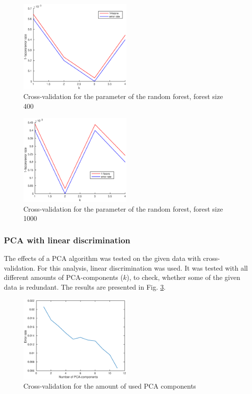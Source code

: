 \documentclass[twoside]{article}
\begin{document}
\begin{multicols}{2}
\begin{figure}[H]
\centering
\includegraphics[width=0.5\textwidth]{randforcrossval400}
\caption{Cross-validation for the parameter of the random forest, forest size 400}
\label{fig:RF400crossval}
\end{figure}

\begin{figure}[H]
\centering
\includegraphics[width=0.5\textwidth]{randforcrossval1000}
\caption{Cross-validation for the parameter of the random forest, forest size 1000}
\label{fig:RF1000crossval}
\end{figure}

\subsubsection{PCA with linear discrimination}

The effects of a PCA algorithm was tested on the given data with cross-validation. 
For this analysis, linear discrimination was used. It was tested with all different
amounts of PCA-components ($k$), to check, whether some of the given data is redundant.
The results are presented in Fig. \ref{fig:lindiscrpca}.

\begin{figure}[H]
\centering
\includegraphics[width=0.5\textwidth]{lindiskrpca}
\caption{Cross-validation for the amount of used PCA components}
\label{fig:lindiscrpca}
\end{figure}


\end{multicols}
\end{document}
